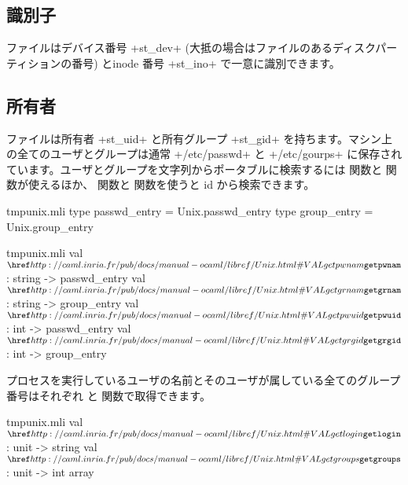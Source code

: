 \subsection*{識別子}

ファイルはデバイス番号 \ml+st_dev+ (大抵の場合はファイルのあるディスクパーティションの番号) とinode 番号 \ml+st_ino+ で一意に識別できます。

\subsection*{所有者}

ファイルは所有者 \ml+st_uid+ と所有グループ \ml+st_gid+ を持ちます。マシン上の全てのユーザとグループは通常 \ml+/etc/passwd+ と \ml+/etc/gourps+ に保存されています。ユーザとグループを文字列からポータブルに検索するには  関数と  関数が使えるほか、 関数と  関数を使うと id から検索できます。
%
\begin{codefile}{tmpunix.mli}
type passwd_entry = Unix.passwd_entry
type group_entry = Unix.group_entry
\end{codefile}
%
\begin{listingcodefile}{tmpunix.mli}
val $\libvalue{Unix}{getpwnam}$ : string -> passwd_entry
val $\libvalue{Unix}{getgrnam}$ : string -> group_entry
val $\libvalue{Unix}{getpwuid}$ : int -> passwd_entry
val $\libvalue{Unix}{getgrgid}$ : int -> group_entry
\end{listingcodefile}

プロセスを実行しているユーザの名前とそのユーザが属している全てのグループ番号はそれぞれ  と  関数で取得できます。
%
\begin{listingcodefile}{tmpunix.mli}
val $\libvalue{Unix}{getlogin}$ : unit -> string
val $\libvalue{Unix}{getgroups}$ : unit -> int array
\end{listingcodefile}

